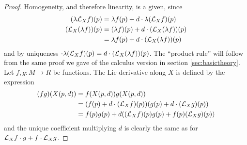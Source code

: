 \begin{proof}
  Homogeneity, and therefore linearity, is a given, since
  \begin{align*}
    (\lambda\mathcal L_Xf)(p)    &= \lambda f(p) + d\cdot\lambda(\mathcal L_Xf)(p)      \\
    (\mathcal L_X(\lambda f))(p) &= (\lambda f)(p) + d\cdot(\mathcal L_X(\lambda f))(p) \\
                           &= \lambda f(p) + d\cdot(\mathcal L_X(\lambda f))(p)
  \end{align*}
  and by uniqueness \( \cdot\lambda(\mathcal L_Xf)(p) = d\cdot(\mathcal L_X(\lambda f))(p) \). The ``product rule'' will follow from the same proof we gave of the calculus version in section \ref{sec:basictheory}. Let \( f,g:M\to R \) be functions. The Lie derivative along \( X \) is defined by the expression
  \begin{align*}
    (fg)(X(p,d)) &= f(X(p,d))g(X(p,d))                                     \\
                 &= (f(p) + d\cdot(\mathcal L_Xf)(p))(g(p) + d\cdot(\mathcal L_Xg)(p)) \\
		 &= f(p)g(p) + d((\mathcal L_Xf)(p)g(p) + f(p)(\mathcal L_Xg)(p))
  \end{align*}
  and the unique coefficient multiplying \( d \) is clearly the same as for \( \mathcal L_Xf\cdot g + f\cdot\mathcal L_Xg \).
\end{proof}
